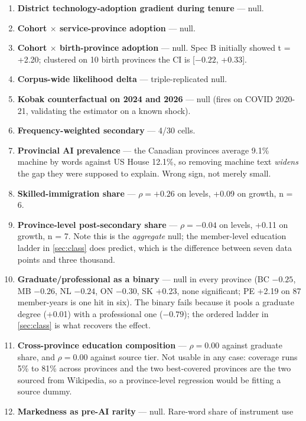 \begin{enumerate}
\def\labelenumi{\arabic{enumi}.}
\item
  \textbf{District technology-adoption gradient during tenure} --- null.
\item
  \textbf{Cohort \(\times\) service-province adoption} --- null.
\item
  \textbf{Cohort \(\times\) birth-province adoption} --- null. Spec B initially showed
  t = +2.20; clustered on 10 birth provinces the CI is {[}\(-0.22\), +0.33{]}.
\item
  \textbf{Corpus-wide likelihood delta} --- triple-replicated null.
\item
  \textbf{Kobak counterfactual on 2024 and 2026} --- null (fires on COVID 2020-21,
  validating the estimator on a known shock).
\item
  \textbf{Frequency-weighted secondary} --- 4/30 cells.
\item
  \textbf{Provincial AI prevalence} --- the Canadian provinces average 9.1\% machine
  by words against US House 12.1\%, so removing machine text \emph{widens} the gap
  they were supposed to explain. Wrong sign, not merely small.
\item
  \textbf{Skilled-immigration share} --- \(\rho = +0.26\) on levels, +0.09 on growth, n = 6.
\item
  \textbf{Province-level post-secondary share} --- \(\rho = -0.04\) on levels, +0.11 on
  growth, n = 7. Note this is the \emph{aggregate} null; the member-level
  education ladder in \cref{sec:class} does predict, which is the difference between
  seven data points and three thousand.
\item
  \textbf{Graduate/professional as a binary} --- null in every province (BC \(-0.25\),
  MB \(-0.26\), NL \(-0.24\), ON \(-0.30\), SK +0.23, none significant; PE +2.19 on 87
  member-years is one hit in six). The binary fails because it pools a
  graduate degree (+0.01) with a professional one (\(-0.79\)); the ordered
  ladder in \cref{sec:class} is what recovers the effect.
\item
  \textbf{Cross-province education composition} --- \(\rho = 0.00\) against graduate
  share, and \(\rho = 0.00\) against source tier. Not usable in any case: coverage
  runs 5\% to 81\% across provinces and the two best-covered provinces are the
  two sourced from Wikipedia, so a province-level regression would be
  fitting a source dummy.
\item
  \textbf{Markedness as pre-AI rarity} --- null. Rare-word share of instrument use

\end{enumerate}
